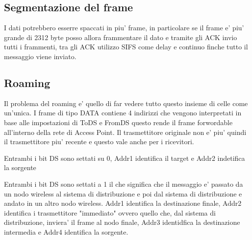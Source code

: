 \subsection{Segmentazione del frame}
I dati potrebbero esserre spaccati in piu' frame, in particolare se il frame e' piu' grande di 2312 byte posso allora frammentare il dato e tramite gli ACK invio tutti i frammenti, tra gli ACK utilizzo SIFS come delay e continuo finche tutto il messaggio viene inviato.
\subsection{Roaming}
Il problema del roaming e' quello di far vedere tutto questo insieme di celle come un'unica. I frame di tipo DATA contiene 4 indirizzi che vengono interpretati in base alle impostazioni di ToDS e FromDS questo rende il frame forwordable all'interno della rete di Access Point. Il trasmettitore originale non e' piu' quindi il trasmettitore piu' recente e questo vale anche per i ricevitori.
\begin{example}
  Entrambi i bit DS sono settati su 0, Addr1 identifica il target e Addr2 indetifica la sorgente
\end{example}
\begin{example}
  Entrambi i bit DS sono settati a 1 il che significa che il messaggio e' passato da un nodo wireless al sistema di distribuzione e poi dal sistema di distribuzione e andato in un altro nodo wireless. Addr1 identifica la destinazione finale, Addr2 identifica i trasmettitore "immediato" ovvero quello che, dal sistema di distribuzione, inviera' il frame al nodo finale, Addr3 identidfica la destinazione intermedia e Addr4 identifica la sorgente.
\end{example}

